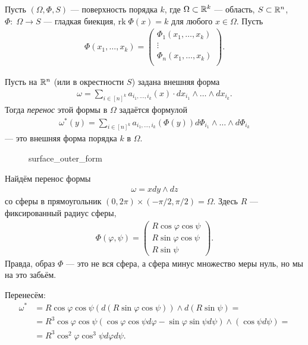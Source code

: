 \begin{df}
 Пусть $(\Omega, \Phi, S)$ --- поверхность порядка $k$, где $\Omega \subset \mathbb{R}^{k}$ --- область, $S \subset \mathbb{R}^{n}$, $\Phi \colon\; \Omega \to S$ --- гладкая биекция, $\mathrm{rk}\;\Phi(x) = k$ для любого $x \in \Omega$. Пусть
 \begin{align*}
  \Phi(x_1, \ldots, x_k) = \begin{pmatrix}
   \Phi_1(x_1, \ldots, x_k) \\
   \vdots \\
   \Phi_n(x_1, \ldots, x_k) \\
  \end{pmatrix}
 .\end{align*} 

 Пусть на $\mathbb{R}^{n}$ (или в окрестности $S$) задана внешняя форма
 \begin{align*}
  \omega = \sum_{i \in [n]^{k}} a_{i_1,\ldots,i_k}(x) \cdot dx_{i_1} \land \ldots \land dx_{i_k}
 .\end{align*} Тогда \textit{перенос} этой формы в $\Omega$ задаётся формулой
 \begin{align*}
  \omega^{\ast}(y) = \sum_{i \in [n]^{k}} a_{i_1,\ldots,i_k} (\Phi(y)) d\Phi_{i_1} \land \ldots \land d \Phi_{i_k}
 \end{align*}  --- это внешняя форма порядка $k$ в $\Omega$.
\end{df}
\begin{figure}[ht]
    \centering
    \caption{surface_outer_form}
    \label{fig:surface_outer_form}
\end{figure}
\begin{exmpl}
 Найдём перенос формы
 \begin{align*}
  \omega = x dy \land dz
 \end{align*} со сферы в прямоугольник $(0, 2\pi) \times (-\pi / 2, \pi / 2) = \Omega$. Здесь $R$ --- фиксированный радиус сферы,
 \begin{align*}
  \Phi(\varphi, \psi) = \begin{pmatrix}
   R \cos \varphi \cos \psi \\
   R \sin \varphi \cos \psi \\
   R \sin \psi
  \end{pmatrix}
 .\end{align*} Правда, образ $\Phi$ --- это не вся сфера, а сфера минус множество меры нуль, но мы на это забьём.

 Перенесём:
 \begin{align*}
  \omega^{\ast} &= R \cos \varphi \cos \psi (d (R \sin \varphi \cos \psi)) \land d(R \sin \psi) = \\
  &= R^{3} \cos\varphi \cos\psi (\cos\varphi \cos \psi d\varphi - \sin\varphi\sin\psi d\psi) \land (\cos\psi d \psi) = \\
  &= R^{3} \cos^{2}\varphi\cos^{3}\psi d\varphi d\psi
 .\end{align*} 
\end{exmpl}

